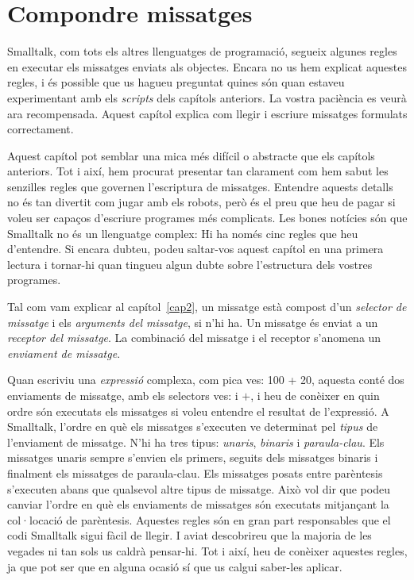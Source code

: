 \chapter{Compondre missatges}
\label{cap11}
Smalltalk, com tots els altres llenguatges de programació, segueix algunes regles en executar els missatges enviats als objectes. Encara no us hem explicat aquestes regles, i és possible que us hagueu preguntat quines són quan estaveu experimentant amb els \emph{scripts} dels capítols anteriors. La vostra paciència es veurà ara recompensada. Aquest capítol explica com llegir i escriure missatges formulats correctament.

Aquest capítol pot semblar una mica més difícil o abstracte que els capítols anteriors. Tot i així, hem procurat presentar tan clarament com hem sabut les senzilles regles que governen l'escriptura de missatges. Entendre aquests detalls no és tan divertit com jugar amb els robots, però és el preu que heu de pagar si voleu ser capaços d'escriure programes més complicats. Les bones notícies són que Smalltalk no és un llenguatge complex: Hi ha només cinc regles que heu d'entendre. Si encara dubteu, podeu saltar-vos aquest capítol en una primera lectura i tornar-hi quan tingueu algun dubte sobre l'estructura dels vostres programes.

Tal com vam explicar al capítol~\ref{cap2}, un missatge està compost d'un \emph{selector de missatge} i els \emph{arguments del missatge}, si n'hi ha. Un missatge és enviat a un \emph{receptor del missatge}. La combinació del missatge i el receptor s'anomena un \emph{enviament de missatge}.

Quan escriviu una \emph{expressió} complexa, com \textsf{pica ves: 100 + 20}, aquesta conté dos enviaments de missatge, amb els selectors \textsf{ves:} i \textsf{$+$}, i heu de conèixer en quin ordre són executats els missatges si voleu entendre el resultat de l'expressió. A Smalltalk, l'ordre en què els missatges s'executen ve determinat pel \emph{tipus} de l'enviament de missatge. N'hi ha tres tipus: \emph{unaris}, \emph{binaris} i \emph{paraula-clau}. Els missatges unaris sempre s'envien els primers, seguits dels missatges binaris i finalment els missatges de paraula-clau. Els missatges posats entre parèntesis s'executen abans que qualsevol altre tipus de missatge. Això vol dir que podeu canviar l'ordre en què els enviaments de missatges són executats mitjançant la col·locació de parèntesis. Aquestes regles són en gran part responsables que el codi Smalltalk sigui fàcil de llegir. I aviat descobrireu que la majoria de les vegades ni tan sols us caldrà pensar-hi. Tot i així, heu de conèixer aquestes regles, ja que pot ser que en alguna ocasió sí que us calgui saber-les aplicar.

